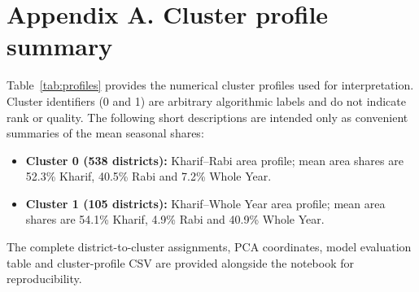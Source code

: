 \documentclass[9pt,a4paper,twocolumn]{extarticle}
\begin{document}
\section*{Appendix A. Cluster profile summary}
Table~\ref{tab:profiles} provides the numerical cluster profiles used for interpretation. Cluster identifiers (0 and 1) are arbitrary algorithmic labels and do not indicate rank or quality. The following short descriptions are intended only as convenient summaries of the mean seasonal shares:
\begin{itemize}
\item \textbf{Cluster 0 (538 districts):} Kharif--Rabi area profile; mean area shares are 52.3\% Kharif, 40.5\% Rabi and 7.2\% Whole Year.
\item \textbf{Cluster 1 (105 districts):} Kharif--Whole Year area profile; mean area shares are 54.1\% Kharif, 4.9\% Rabi and 40.9\% Whole Year.
\end{itemize}
The complete district-to-cluster assignments, PCA coordinates, model evaluation table and cluster-profile CSV are provided alongside the notebook for reproducibility.
\end{document}
